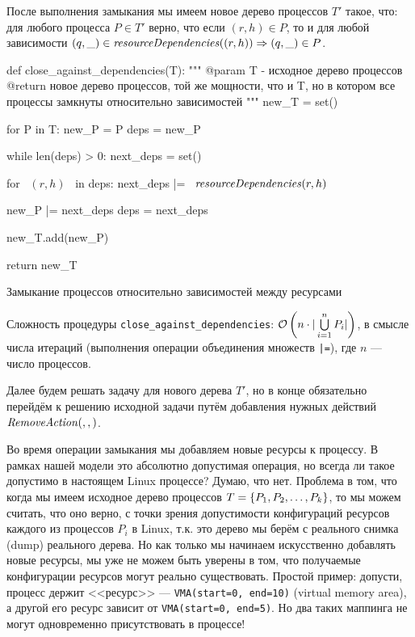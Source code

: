 После выполнения замыкания мы имеем новое дерево процессов $T'$ такое, что: для любого процесса $P \in T'$ верно, что если $(r, h) \in P$, то и для любой зависимости $(q, \_) \in \text{\textit{resourceDependencies}}((r, h)) \Rightarrow (q, \_) \in P$.

\begin{listing}[ht!]
\begin{pythoncode}
def close_against_dependencies(T):
    """
    @param T - исходное дерево процессов
    @return новое дерево процессов, той же мощности, что и T, но в котором все процессы 
            замкнуты относительно зависимостей
    """
    new_T = set()

    for P in T:
        new_P = P
        deps = new_P

        while len(deps) > 0:
            next_deps = set()

            for ~$(r, h)$~ in deps:
                next_deps |= ~$\crdependenices{r, h}$~

            new_P |= next_deps
            deps = next_deps

        new_T.add(new_P)

    return new_T
\end{pythoncode}
\caption{Замыкание процессов относительно зависимостей между ресурсами}
\label{code:closedeps}
\end{listing}

Сложность процедуры \texttt{close\_against\_dependencies}: $\mathcal{O}\left(n\cdot|\bigcup\limits_{i = 1}^{n}{P_i}|\right)$, в смысле числа итераций (выполнения операции объединения множеств \texttt{|=}), где $n$ --- число процессов.

Далее будем решать задачу для нового дерева $T'$, но в конце обязательно перейдём к решению исходной задачи путём добавления нужных действий $\text{\textit{RemoveAction}}(, , )$.

\begin{note}
\label{note:badresourceconfig}
Во время операции замыкания мы добавляем новые ресурсы к процессу. В рамках нашей модели это абсолютно допустимая операция, но всегда ли такое допустимо в настоящем Linux процессе? Думаю, что нет. Проблема в том, что когда мы имеем исходное дерево процессов $T = \left\lbrace P_1, P_2, \ldots, P_k \right\rbrace$, то мы можем считать, что оно верно, с точки зрения допустимости конфигураций ресурсов каждого из процессов $P_i$ в Linux, т.к. это дерево мы берём с реального снимка (dump) реального дерева. Но как только мы начинаем искусственно добавлять новые ресурсы, мы уже не можем быть уверены в том, что получаемые конфигурации ресурсов могут реально существовать. Простой пример: допусти, процесс держит <<ресурс>> --- \texttt{VMA(start=0, end=10)} (virtual memory area), а другой его ресурс зависит от \texttt{VMA(start=0, end=5)}. Но два таких маппинга не могут одновременно присутствовать в процессе!
\end{note}

